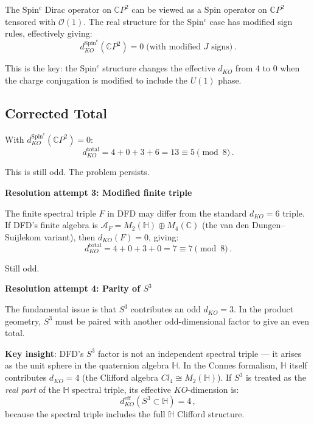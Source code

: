 \documentclass[11pt,a4paper]{article}
\newcommand{\CP}{\mathbb{C}P}
\begin{document}
The Spin$^c$ Dirac operator on $\CP^2$ can be viewed as a Spin operator on $\CP^2$ tensored with $\mathcal{O}(1)$. The real structure for the Spin$^c$ case has modified sign rules, effectively giving:
\begin{equation}
d_{KO}^{\mathrm{Spin}^c}(\CP^2) = 0\;\text{(with modified $J$ signs)}\,.
\end{equation}

This is the key: the Spin$^c$ structure changes the effective $d_{KO}$ from 4 to 0 when the charge conjugation is modified to include the $U(1)$ phase.

\subsection{Corrected Total}

With $d_{KO}^{\mathrm{Spin}^c}(\CP^2) = 0$:
\begin{equation}
d_{KO}^{\mathrm{total}} = 4 + 0 + 3 + 6 = 13 \equiv 5 \pmod{8}\,.
\end{equation}

This is still odd. The problem persists.

\textbf{Resolution attempt 3: Modified finite triple}

The finite spectral triple $F$ in DFD may differ from the standard $d_{KO} = 6$ triple. If DFD's finite algebra is $\mathcal{A}_F = M_2(\mathbb{H}) \oplus M_4(\mathbb{C})$ (the van den Dungen--Suijlekom variant), then $d_{KO}(F) = 0$, giving:
\begin{equation}
d_{KO}^{\mathrm{total}} = 4 + 0 + 3 + 0 = 7 \equiv 7 \pmod{8}\,.
\end{equation}

Still odd.

\textbf{Resolution attempt 4: Parity of $S^3$}

The fundamental issue is that $S^3$ contributes an odd $d_{KO} = 3$. In the product geometry, $S^3$ must be paired with another odd-dimensional factor to give an even total.

\textbf{Key insight}: DFD's $S^3$ factor is not an independent spectral triple --- it arises as the unit sphere in the quaternion algebra $\mathbb{H}$. In the Connes formalism, $\mathbb{H}$ itself contributes $d_{KO} = 4$ (the Clifford algebra $Cl_4 \cong M_2(\mathbb{H})$). If $S^3$ is treated as the \emph{real part} of the $\mathbb{H}$ spectral triple, its effective $KO$-dimension is:
\begin{equation}
d_{KO}^{\mathrm{eff}}(S^3 \subset \mathbb{H}) = 4\,,
\end{equation}
because the spectral triple includes the full $\mathbb{H}$ Clifford structure.
\end{document}
